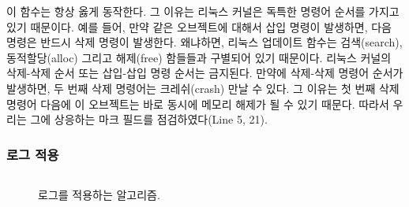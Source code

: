 이 함수는 항상 옳게 동작한다. 그 이유는 리눅스 커널은 독특한 명령어 순서를 가지고 있기 
때문이다.
예를 들어, 만약 같은 오브젝트에 대해서 삽입 명령이 발생하면, 다음 명령은 반드시 삭제 명령이 발생한다.
왜냐하면, 리눅스 업데이트 함수는 검색(search), 동적할당(alloc) 그리고 해제(free) 함들들과 
구별되어 있기 때문이다.
리눅스 커널의 삭제-삭제 순서 또는 삽입-삽입 명령 순서는 금지된다. 
만약에 삭제-삭제 명령어 순서가 발생하면, 두 번째 삭제 명령어는 크레쉬(crash) 만날 수 있다.
그 이유는 첫 번째 삭제 명령어 다음에 이 오브젝트는 바로 동시에 메모리 해제가 될 수 있기 때문다.
따라서 우리는 그에 상응하는 마크 필드를 점검하였다(Line 5, 21).


\subsubsection{로그 적용}

\begin{figure}[h]
\begin{center}
\inputminted[linenos,fontsize=\footnotesize, tabsize=4]{c}{src/ldu_physical.c}
\end{center}
\caption{로그를 적용하는 알고리즘.}
\label{fig:glduphysicalupdate}
\end{figure}




